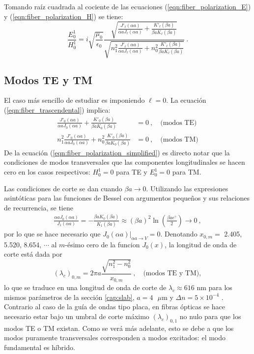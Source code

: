 Tomando raíz cuadrada al cociente de las ecuaciones (\ref{eqn:fiber_polarization_E}) y (\ref{eqn:fiber_polarization_H}) se tiene:
\begin{equation}
	\frac{E_0^1}{H_0^1} = i \sqrt{\frac{\mu_0}{\epsilon_0}} \frac{\sqrt{ \frac{J'_\ell(\alpha a)}{\alpha a J_\ell(\alpha a)} + \frac{K'_\ell(\beta a)}{\beta a K_\ell(\beta a)}}}{\sqrt{n_1^2 \frac{J'_\ell(\alpha a)}{\alpha a J_\ell(\alpha a)} + n_0^2 \frac{K'_\ell(\beta a)}{\beta a K_\ell(\beta a)}}} \ .
	\label{eqn:fiber_polarization_simplified}
\end{equation}
\subsection{Modos TE y TM}
El caso más sencillo de estudiar es imponiendo $\ell = 0$. La ecuación (\ref{eqn:fiber_trascendental}) implica:
\begin{align*}
	\frac{J'_{0}(\alpha a)}{\alpha a J_0(\alpha a)} + \frac{K'_0(\beta a)}{\beta a K_0(\beta a)}&=  0 \ , \quad \text{(modos TE)}
	\\
	n_1^2\frac{J'_{0}(\alpha a)}{\alpha a J_0(\alpha a)} + n_0^2 \frac{K'_0(\beta a)}{\beta a K_0(\beta a)} &= 0 \ , \quad \text{(modos TM)}
\end{align*}
De la ecuación (\ref{eqn:fiber_polarization_simplified}) es directo notar que la condiciones de modos transversales que las componentes longitudinales se hacen cero en los casos respectivos: $H_0^1 = 0$ para TE y $E_0^1 = 0$ para TM.

Las condiciones de corte se dan cuando $\beta a \to 0$. Utilizando las expresiones asintóticas para las funciones de Bessel con argumentos pequeños y sus relaciones de recurrencia, se tiene
\begin{align*}
	\frac{\alpha a J_0(\alpha a)}{J_1(\alpha a)}  = -\frac{\beta a K_{0}(\beta a)} {K_1(\beta a)} \approx (\beta a)^2\ln\left(\frac{\beta a e^\gamma}{2}\right) \to 0 \ ,
\end{align*}
por lo que se hace necesario que $\left. J_0(\alpha a)\right|_{\alpha a \to V} = 0$. Denotando $x_{0,m}=$ 2.405,  5.520,  8.654, $\cdots$ al $m$-ésimo cero de la funcion $J_0(x)$, la longitud de onda de corte está dada por 
\begin{equation}
(\lambda_c)_{0,m} = 2\pi a \frac{\sqrt{n_1^2 - n_0^2}}{x_{0,m}} \ , \quad\text{(modos TE y TM)},
\end{equation} 
lo que se traduce en una longitud de onda de corte de $\lambda_c\approx 616$ nm para los mismos parámetros de la sección \ref{cap:slab}, $a=4 \text{ }\mu$m y $\Delta n = 5\times 10^{-4}$ . Contrario al caso de la guía de ondas tipo placa, en fibras ópticas se hace necesario estar bajo un umbral de corte máximo $(\lambda_c)_{0,1}$ no nulo para que los modos TE o TM existan. Como se verá más adelante, esto se debe a que los modos puramente transversales corresponden a modos excitados: el modo fundamental es híbrido.

